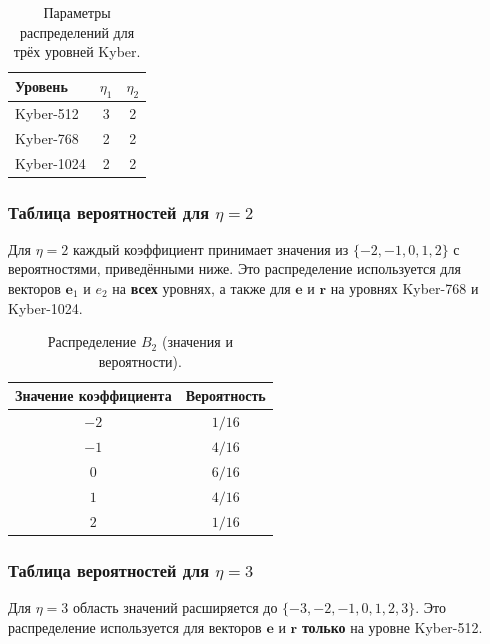 \documentclass[11pt,a4paper]{article}
\begin{document}
\begin{table}[H]
    \centering
    \begin{tabular}{lcc}
        \toprule
        Уровень    & \(\eta_1\) & \(\eta_2\) \\
        \midrule
        Kyber-512  & 3          & 2          \\
        Kyber-768  & 2          & 2          \\
        Kyber-1024 & 2          & 2          \\
        \bottomrule
    \end{tabular}
    \caption{Параметры распределений для трёх уровней Kyber.}
\end{table}

\subsubsection{Таблица вероятностей для \(\eta=2\)}

Для \(\eta=2\) каждый коэффициент принимает значения из \(\{-2,-1,0,1,2\}\) с вероятностями, приведёнными ниже. Это распределение используется для векторов \(\mathbf{e}_1\) и \(e_2\) на \textbf{всех} уровнях, а также для \(\mathbf{e}\) и \(\mathbf{r}\) на уровнях Kyber-768 и Kyber-1024.

\begin{table}[H]
    \centering
    \begin{tabular}{c c}
        \toprule
        Значение коэффициента & Вероятность \\
        \midrule
        \(-2\)                & \(1/16\)    \\
        \(-1\)                & \(4/16\)    \\
        \(0\)                 & \(6/16\)    \\
        \(1\)                 & \(4/16\)    \\
        \(2\)                 & \(1/16\)    \\
        \bottomrule
    \end{tabular}
    \caption{Распределение \(B_2\) (значения и вероятности).}
\end{table}

\subsubsection{Таблица вероятностей для \(\eta=3\)}

Для \(\eta=3\) область значений расширяется до \(\{-3,-2,-1,0,1,2,3\}\). Это распределение используется для векторов \(\mathbf{e}\) и \(\mathbf{r}\) \textbf{только} на уровне Kyber-512.
\end{document}
